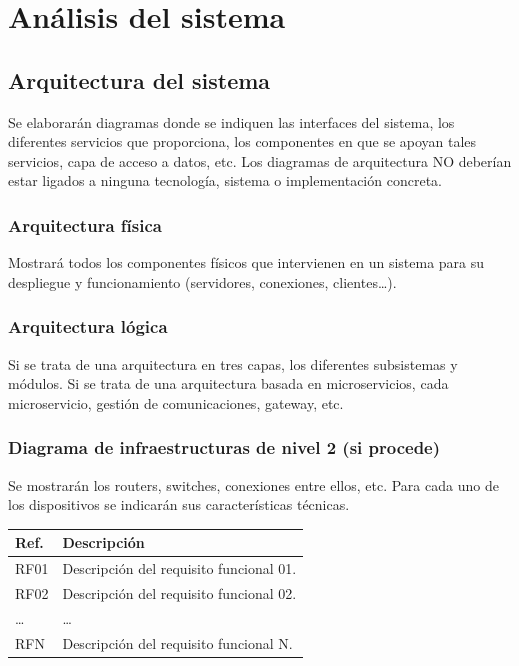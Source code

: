 \vspace*{-1cm}
\section{Análisis del sistema}
\label{sec:analisis}


\subsection{Arquitectura del sistema}
Se elaborarán diagramas donde se indiquen las interfaces del sistema, los diferentes servicios que proporciona, los componentes en que se apoyan tales servicios, capa de acceso a datos, etc. Los diagramas de arquitectura NO deberían estar ligados a ninguna tecnología, sistema o implementación concreta.

\subsubsection{Arquitectura física}
Mostrará todos los componentes físicos que intervienen en un sistema para su despliegue y funcionamiento (servidores, conexiones, clientes…).

\subsubsection{Arquitectura lógica}
Si se trata de una arquitectura en tres capas, los diferentes subsistemas y módulos. Si se trata de una arquitectura basada en microservicios, cada microservicio, gestión de comunicaciones, gateway, etc.

\subsubsection{Diagrama de infraestructuras de nivel 2 (si procede)}
Se mostrarán los routers, switches, conexiones entre ellos, etc. Para cada uno de los dispositivos se indicarán sus características técnicas.

\begin{table}[h]
    \centering
        \setlength{\arrayrulewidth}{0.05mm} %
        \begin{tabular}{|p{2cm}|p{10cm}|}
            \hline
            \textbf{Ref.} & \textbf{Descripción} \\
            \hline
            RF01 & Descripción del requisito funcional 01. \\
            \hline
            RF02 & Descripción del requisito funcional 02. \\
            \hline
            \ldots & \ldots \\
            \hline
            RFN & Descripción del requisito funcional N. \\
            \hline
        \end{tabular}
    \label{tab:coste_estimado_servicio}
\end{table}

